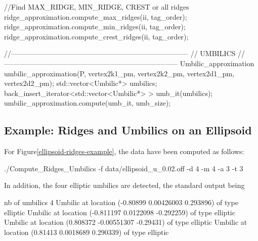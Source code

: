 \begin{ccExampleCode}
{  //Find MAX_RIDGE, MIN_RIDGE, CREST or all ridges
  ridge_approximation.compute_max_ridges(ii, tag_order);  
  ridge_approximation.compute_min_ridges(ii, tag_order);  
  ridge_approximation.compute_crest_ridges(ii, tag_order);  

  //---------------------------------------------------------------------------
  // UMBILICS
  //--------------------------------------------------------------------------
  Umbilic_approximation umbilic_approximation(P, 
					      vertex2k1_pm, vertex2k2_pm,
					      vertex2d1_pm, vertex2d2_pm);
  std::vector<Umbilic*> umbilics;
  back_insert_iterator<std::vector<Umbilic*> > umb_it(umbilics);
  umbilic_approximation.compute(umb_it, umb_size);
 }
\end{ccExampleCode}

\subsection{Example: Ridges and Umbilics  on an Ellipsoid}

For Figure\ref{ellipsoid-ridges-example}, the data have been computed as follows:
\begin{ccExampleCode}
./Compute_Ridges_Umbilics -f data/ellipsoid_u_0.02.off -d 4 -m 4 -a 3 -t 3
\end{ccExampleCode}
In addition, the four elliptic umbilics are detected, the standard output being
\begin{ccExampleCode}
nb of umbilics 4
Umbilic at location (-0.80899 0.00426003 0.293896) of type elliptic
Umbilic at location (-0.811197 0.0122098 -0.292259) of type elliptic
Umbilic at location (0.808372 -0.00551307 -0.29431) of type elliptic
Umbilic at location (0.81413 0.0018689 0.290339) of type elliptic
\end{ccExampleCode}


